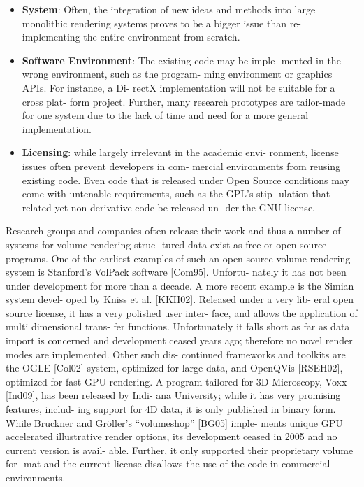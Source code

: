 \begin{itemize}

  \item \textbf{System}:
	Often, the integration of new ideas and methods
	into large monolithic rendering systems proves to be a
	bigger issue than re-implementing the entire environment
	from scratch.

	\item \textbf{Software Environment}: The existing code may be imple-
	mented in the wrong environment, such as the program-
	ming environment or graphics APIs. For instance, a Di-
	rectX implementation will not be suitable for a cross plat-
	form project. Further, many research prototypes are tailor-made
	for one system due to the lack of time and need for
	a more general implementation.

	\item \textbf{Licensing}: while largely irrelevant in the academic envi-
	ronment, license issues often prevent developers in com-
	mercial environments from reusing existing code. Even
	code that is released under Open Source conditions may
	come with untenable requirements, such as the GPL’s stip-
	ulation that related yet non-derivative code be released un-
	der the GNU license.

\end{itemize}

Research groups and companies often release their work
and thus a number of systems for volume rendering struc-
tured data exist as free or open source programs. One of the
earliest examples of such an open source volume rendering
system is Stanford’s VolPack software [Com95]. Unfortu-
nately it has not been under development for more than a
decade. A more recent example is the Simian system devel-
oped by Kniss et al. [KKH02]. Released under a very lib-
eral open source license, it has a very polished user inter-
face, and allows the application of multi dimensional trans-
fer functions. Unfortunately it falls short as far as data import
is concerned and development ceased years ago; therefore
no novel render modes are implemented. Other such dis-
continued frameworks and toolkits are the OGLE [Col02]
system, optimized for large data, and OpenQVis [RSEH02],
optimized for fast GPU rendering. A program tailored for
3D Microscopy, Voxx [Ind09], has been released by Indi-
ana University; while it has very promising features, includ-
ing support for 4D data, it is only published in binary form.
While Bruckner and Gröller’s “volumeshop” [BG05] imple-
ments unique GPU accelerated illustrative render options, its
development ceased in 2005 and no current version is avail-
able. Further, it only supported their proprietary volume for-
mat and the current license disallows the use of the code in
commercial environments.

